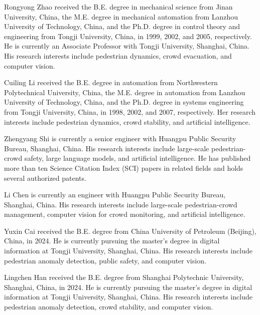 \documentclass[lettersize,journal]{IEEEtran}
\begin{document}
\begin{IEEEbiography}{Rongyong Zhao}
received the B.E. degree in mechanical science from Jinan University, China, the M.E. degree in mechanical automation from Lanzhou University of Technology, China, and the Ph.D. degree in control theory and engineering from Tongji University, China, in 1999, 2002, and 2005, respectively.
He is currently an Associate Professor with Tongji University, Shanghai, China.
His research interests include pedestrian dynamics, crowd evacuation, and computer vision.
\end{IEEEbiography}
\compactbiogap

\begin{IEEEbiography}{Cuiling Li}
received the B.E. degree in automation from Northwestern Polytechnical University, China, the M.E. degree in automation from Lanzhou University of Technology, China, and the Ph.D. degree in systems engineering from Tongji University, China, in 1998, 2002, and 2007, respectively.
Her research interests include pedestrian dynamics, crowd stability, and artificial intelligence.
\end{IEEEbiography}
\compactbiogap

\begin{IEEEbiography}{Zhengyang Shi}
is currently a senior engineer with Huangpu Public Security Bureau, Shanghai, China.
His research interests include large-scale pedestrian-crowd safety, large language models, and artificial intelligence.
He has published more than ten Science Citation Index (SCI) papers in related fields and holds several authorized patents.
\end{IEEEbiography}
\compactbiogap

\begin{IEEEbiography}{Li Chen}
is currently an engineer with Huangpu Public Security Bureau, Shanghai, China.
His research interests include large-scale pedestrian-crowd management, computer vision for crowd monitoring, and artificial intelligence.
\end{IEEEbiography}
\compactbiogap

\begin{IEEEbiography}{Yuxin Cai}
received the B.E. degree from China University of Petroleum (Beijing), China, in 2024.
He is currently pursuing the master's degree in digital information at Tongji University, Shanghai, China.
His research interests include pedestrian anomaly detection, public safety, and computer vision.
\end{IEEEbiography}
\compactbiogap

\begin{IEEEbiography}{Lingchen Han}
received the B.E. degree from Shanghai Polytechnic University, Shanghai, China, in 2024.
He is currently pursuing the master's degree in digital information at Tongji University, Shanghai, China.
His research interests include pedestrian anomaly detection, crowd stability, and computer vision.
\end{IEEEbiography}
\end{document}
